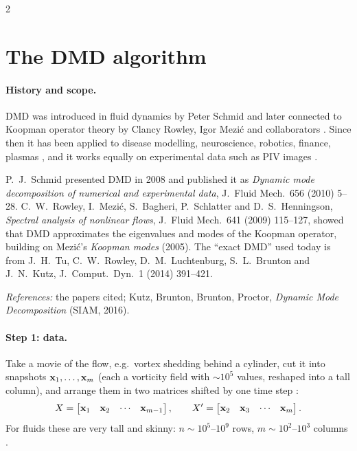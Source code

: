 \begin{paracol}{2}
\section{The DMD algorithm}\label{sec:dmd-algorithm}

\paragraph{History and scope.} DMD was introduced in fluid dynamics by Peter Schmid and later connected
to Koopman operator theory by Clancy Rowley, Igor Mezi\'c and collaborators . Since then it
has been applied to disease modelling, neuroscience, robotics, finance, plasmas , and it
works equally on experimental data such as PIV images .

\begin{history}
P.~J.~Schmid presented DMD in 2008 and published it as \emph{Dynamic mode decomposition of numerical and
experimental data}, J.\ Fluid Mech.\ 656 (2010) 5--28. C.~W.~Rowley, I.~Mezi\'c, S.~Bagheri,
P.~Schlatter and D.~S.~Henningson, \emph{Spectral analysis of nonlinear flows}, J.\ Fluid Mech.\ 641
(2009) 115--127, showed that DMD approximates the eigenvalues and modes of the Koopman operator,
building on Mezi\'c's \emph{Koopman modes} (2005). The ``exact DMD'' used today is from J.~H.~Tu,
C.~W.~Rowley, D.~M.~Luchtenburg, S.~L.~Brunton and J.~N.~Kutz, J.\ Comput.\ Dyn.\ 1 (2014) 391--421.\par
\textit{References:} the papers cited; Kutz, Brunton, Brunton, Proctor, \emph{Dynamic Mode
Decomposition} (SIAM, 2016).
\end{history}

\Needspace*{9.5cm}\paragraph{Step 1: data.} Take a movie of the flow, e.g.\ vortex shedding behind a cylinder, cut it into
snapshots $\mathbf{x}_1,\dots,\mathbf{x}_m$ (each a vorticity field with $\sim10^5$ values, reshaped into a tall
column), and arrange them in two matrices shifted by one time step :
\begin{equation}\label{eq:dmd-data}
  X=\begin{bmatrix}\mathbf{x}_1&\mathbf{x}_2&\cdots&\mathbf{x}_{m-1}\end{bmatrix},\qquad
  X'=\begin{bmatrix}\mathbf{x}_2&\mathbf{x}_3&\cdots&\mathbf{x}_m\end{bmatrix}.
\end{equation}
For fluids these are very tall and skinny: $n\sim10^5$--$10^9$ rows, $m\sim10^2$--$10^3$ columns
.


\end{paracol}

